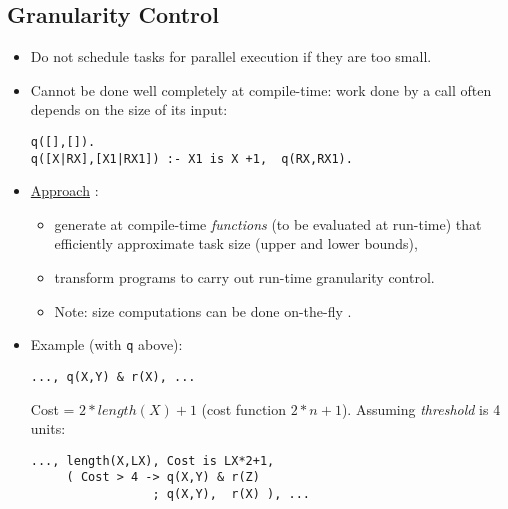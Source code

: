 \documentclass{article}
\renewcommand{\_}{\char'137}
\begin{document}

\subsection{Granularity Control}

\begin{itemize}
\item Do not schedule tasks for parallel execution if they are too small.
\item Cannot be done well completely at compile-time:
work done by a call often depends on the size
of its input:
\vspace{-3mm}
 \begin{verbatim}  
q([],[]).
q([X|RX],[X1|RX1]) :- X1 is X +1,  q(RX,RX1).
\end{verbatim}

\item \underline{Approach} \cite{granularity-jsc}: 
\begin{itemize}
\item generate at compile-time {\em functions} (to be evaluated
at run-time) that efficiently approximate task size (upper and lower
bounds), 
\item transform programs to carry out run-time granularity control.
\item Note: size computations can be done on-the-fly
  \cite{termsize-iclp95}. %
\end{itemize}

\item Example (with {\tt q} above):
\vspace{-3mm}
\begin{verbatim}
..., q(X,Y) & r(X), ...
\end{verbatim}
\vspace{-1mm}
Cost = $2*length(X)+1$ (cost function $2*n+1$).  Assuming
\emph{threshold} is 4 units:
\vspace{-1mm}
\begin{verbatim}
..., length(X,LX), Cost is LX*2+1, 
     ( Cost > 4 -> q(X,Y) & r(Z)
                 ; q(X,Y),  r(X) ), ...
\end{verbatim}
\end{itemize}
\end{document}
